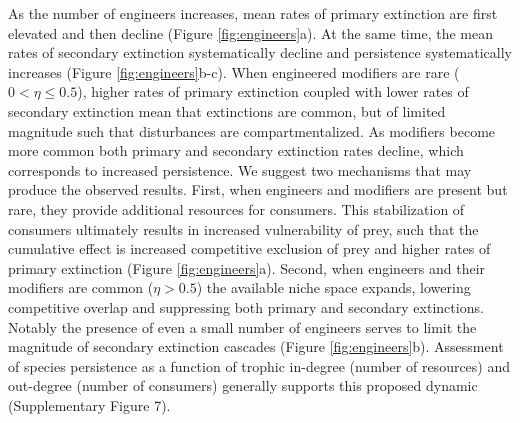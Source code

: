 \documentclass[twocolumn,preprintnumbers,amsmath,amssymb,superscriptaddress,linenumbers]{revtex4-1}
\begin{document}
As the number of engineers increases, mean rates of primary extinction are first elevated and then decline (Figure \ref{fig:engineers}a).
At the same time, the mean rates of secondary extinction systematically decline and persistence systematically increases (Figure \ref{fig:engineers}b-c).
When engineered modifiers are rare ($0 < \eta \leq 0.5$), higher rates of primary extinction coupled with lower rates of secondary extinction mean that extinctions are common, but of limited magnitude such that disturbances are compartmentalized.
As modifiers become more common both primary and secondary extinction rates decline, which corresponds to increased persistence.
We suggest two mechanisms that may produce the observed results.
First, when engineers and modifiers are present but rare, they provide additional resources for consumers.
This stabilization of consumers ultimately results in increased vulnerability of prey, such that the cumulative effect is increased competitive exclusion of prey and higher rates of primary extinction (Figure \ref{fig:engineers}a).
Second, when engineers and their modifiers are common ($\eta > 0.5$) the available niche space expands, lowering competitive overlap and suppressing both primary and secondary extinctions.
Notably the presence of even a small number of engineers serves to limit the magnitude of secondary extinction cascades (Figure \ref{fig:engineers}b).
Assessment of species persistence as a function of trophic in-degree (number of resources) and out-degree (number of consumers) generally supports this proposed dynamic (Supplementary Figure 7). %

\end{document}
